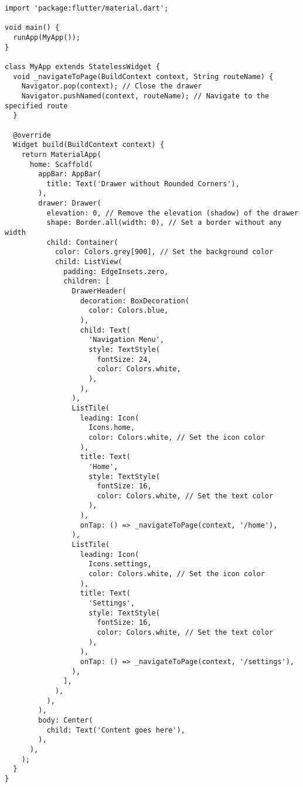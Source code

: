 \begin{lstlisting}
import 'package:flutter/material.dart';

void main() {
  runApp(MyApp());
}

class MyApp extends StatelessWidget {
  void _navigateToPage(BuildContext context, String routeName) {
    Navigator.pop(context); // Close the drawer
    Navigator.pushNamed(context, routeName); // Navigate to the specified route
  }

  @override
  Widget build(BuildContext context) {
    return MaterialApp(
      home: Scaffold(
        appBar: AppBar(
          title: Text('Drawer without Rounded Corners'),
        ),
        drawer: Drawer(
          elevation: 0, // Remove the elevation (shadow) of the drawer
          shape: Border.all(width: 0), // Set a border without any width
          child: Container(
            color: Colors.grey[900], // Set the background color
            child: ListView(
              padding: EdgeInsets.zero,
              children: [
                DrawerHeader(
                  decoration: BoxDecoration(
                    color: Colors.blue,
                  ),
                  child: Text(
                    'Navigation Menu',
                    style: TextStyle(
                      fontSize: 24,
                      color: Colors.white,
                    ),
                  ),
                ),
                ListTile(
                  leading: Icon(
                    Icons.home,
                    color: Colors.white, // Set the icon color
                  ),
                  title: Text(
                    'Home',
                    style: TextStyle(
                      fontSize: 16,
                      color: Colors.white, // Set the text color
                    ),
                  ),
                  onTap: () => _navigateToPage(context, '/home'),
                ),
                ListTile(
                  leading: Icon(
                    Icons.settings,
                    color: Colors.white, // Set the icon color
                  ),
                  title: Text(
                    'Settings',
                    style: TextStyle(
                      fontSize: 16,
                      color: Colors.white, // Set the text color
                    ),
                  ),
                  onTap: () => _navigateToPage(context, '/settings'),
                ),
              ],
            ),
          ),
        ),
        body: Center(
          child: Text('Content goes here'),
        ),
      ),
    );
  }
}
\end{lstlisting}

